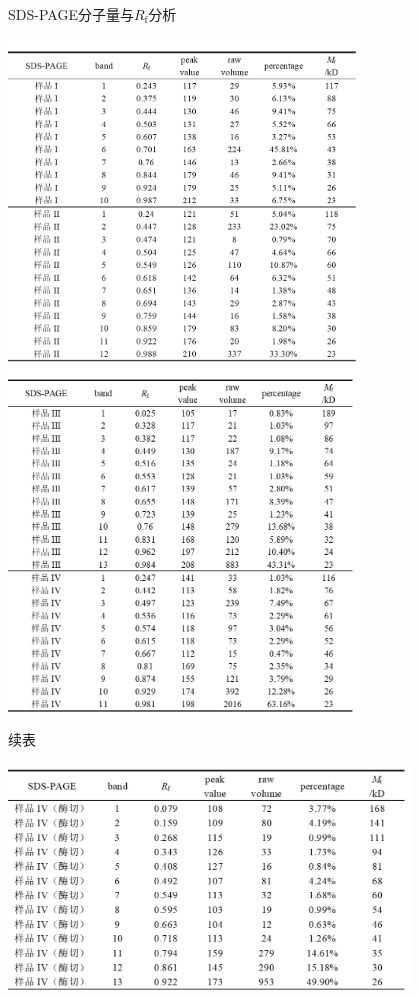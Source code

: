 \newpage
\begin{table}[H]
    \centering
    \caption{SDS-PAGE分子量与$R_\mathrm{f}$分析}
    \includegraphics[width = 0.7\textwidth]{figure/electro_analysis/sds-1.png}
        \includegraphics[width = 0.7\textwidth]{figure/electro_analysis/sds-2.png}
    \label{tab:sds_weight}
\end{table}

\begin{table}[H]
    \centering
    \caption*{续表}
    \includegraphics[width = 0.8\textwidth]{figure/electro_analysis/sds-3.png}
    \label{tab:sds_weight}
\end{table}

